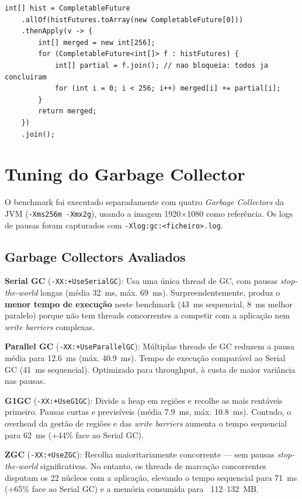 \documentclass[a4paper,11pt,openright,BCOR=15mm]{scrbook}
\begin{document}
\begin{lstlisting}[caption={Merge assíncrono com allOf e thenApply}]
int[] hist = CompletableFuture
    .allOf(histFutures.toArray(new CompletableFuture[0]))
    .thenApply(v -> {
        int[] merged = new int[256];
        for (CompletableFuture<int[]> f : histFutures) {
            int[] partial = f.join(); // nao bloqueia: todos ja concluiram
            for (int i = 0; i < 256; i++) merged[i] += partial[i];
        }
        return merged;
    })
    .join();
\end{lstlisting}

\section{Tuning do Garbage Collector}
\label{sec:gc}

O benchmark foi executado separadamente com quatro \textit{Garbage Collectors} da JVM (\texttt{-Xms256m -Xmx2g}), usando a imagem 1920×1080 como referência. Os logs de pausas foram capturados com \texttt{-Xlog:gc:<ficheiro>.log}.

\subsection{Garbage Collectors Avaliados}

\textbf{Serial GC} (\texttt{-XX:+UseSerialGC}): Usa uma única thread de GC, com pausas \textit{stop-the-world} longas (média 32~ms, máx. 69~ms). Surpreendentemente, produz o \textbf{menor tempo de execução} neste benchmark (43~ms sequencial, 8~ms melhor paralelo) porque não tem threads concorrentes a competir com a aplicação nem \textit{write barriers} complexas.

\textbf{Parallel GC} (\texttt{-XX:+UseParallelGC}): Múltiplas threads de GC reduzem a pausa média para 12.6~ms (máx. 40.9~ms). Tempo de execução comparável ao Serial GC (41~ms sequencial). Optimizado para throughput, à custa de maior variância nas pausas.

\textbf{G1GC} (\texttt{-XX:+UseG1GC}): Divide a heap em regiões e recolhe as mais rentáveis primeiro. Pausas curtas e previsíveis (média 7.9~ms, máx. 10.8~ms). Contudo, o overhead da gestão de regiões e das \textit{write barriers} aumenta o tempo sequencial para 62~ms (+44\% face ao Serial GC).

\textbf{ZGC} (\texttt{-XX:+UseZGC}): Recolha maioritariamente concorrente — sem pausas \textit{stop-the-world} significativas. No entanto, os threads de marcação concorrentes disputam os 22 núcleos com a aplicação, elevando o tempo sequencial para 71~ms (+65\% face ao Serial GC) e a memória consumida para ~112--132~MB.
\end{document}
